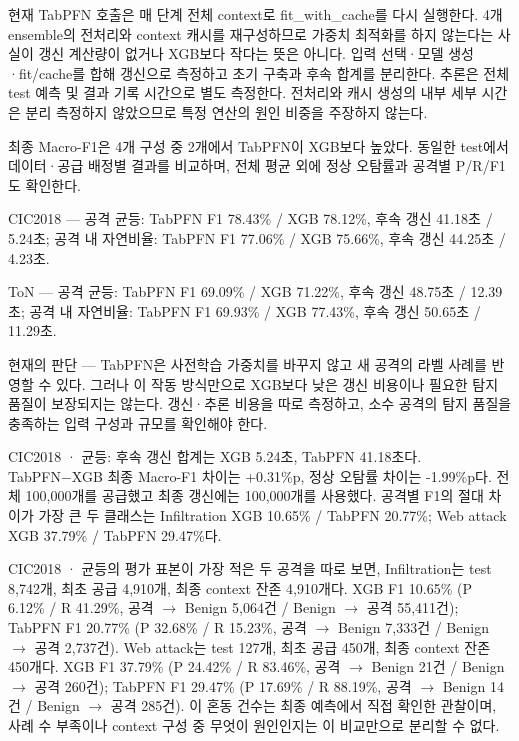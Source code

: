 현재 TabPFN 호출은 매 단계 전체 context로 fit\_\allowbreak{}with\_\allowbreak{}cache를 다시 실행한다. 4개 ensemble의 전처리와 context 캐시를 재구성하므로 가중치 최적화를 하지 않는다는 사실이 갱신 계산량이 없거나 XGB보다 작다는 뜻은 아니다. 입력 선택·모델 생성·fit/\allowbreak{}cache를 합해 갱신으로 측정하고 초기 구축과 후속 합계를 분리한다. 추론은 전체 test 예측 및 결과 기록 시간으로 별도 측정한다. 전처리와 캐시 생성의 내부 세부 시간은 분리 측정하지 않았으므로 특정 연산의 원인 비중을 주장하지 않는다.

최종 Macro-F1은 4개 구성 중 2개에서 TabPFN이 XGB보다 높았다. 동일한 test에서 데이터·공급 배정별 결과를 비교하며, 전체 평균 외에 정상 오탐률과 공격별 P/\allowbreak{}R/\allowbreak{}F1도 확인한다.

CIC2018 — 공격 균등: TabPFN F1 78.43\% /\allowbreak{} XGB 78.12\%, 후속 갱신 41.18초 /\allowbreak{} 5.24초; 공격 내 자연비율: TabPFN F1 77.06\% /\allowbreak{} XGB 75.66\%, 후속 갱신 44.25초 /\allowbreak{} 4.23초.

ToN — 공격 균등: TabPFN F1 69.09\% /\allowbreak{} XGB 71.22\%, 후속 갱신 48.75초 /\allowbreak{} 12.39초; 공격 내 자연비율: TabPFN F1 69.93\% /\allowbreak{} XGB 77.43\%, 후속 갱신 50.65초 /\allowbreak{} 11.29초.

현재의 판단 — TabPFN은 사전학습 가중치를 바꾸지 않고 새 공격의 라벨 사례를 반영할 수 있다. 그러나 이 작동 방식만으로 XGB보다 낮은 갱신 비용이나 필요한 탐지 품질이 보장되지는 않는다. 갱신·추론 비용을 따로 측정하고, 소수 공격의 탐지 품질을 충족하는 입력 구성과 규모를 확인해야 한다.

CIC2018 · 균등: 후속 갱신 합계는 XGB 5.24초, TabPFN 41.18초다. TabPFN−XGB 최종 Macro-F1 차이는 +\allowbreak{}0.31\%p, 정상 오탐률 차이는 -1.99\%p다. 전체 100,000개를 공급했고 최종 갱신에는 100,000개를 사용했다. 공격별 F1의 절대 차이가 가장 큰 두 클래스는 Infiltration XGB 10.65\% /\allowbreak{} TabPFN 20.77\%; Web attack XGB 37.79\% /\allowbreak{} TabPFN 29.47\%다.

CIC2018 · 균등의 평가 표본이 가장 적은 두 공격을 따로 보면, Infiltration는 test 8,742개, 최초 공급 4,910개, 최종 context 잔존 4,910개다. XGB F1 10.65\% (P 6.12\% /\allowbreak{} R 41.29\%, 공격 \ensuremath{\rightarrow} Benign 5,064건 /\allowbreak{} Benign \ensuremath{\rightarrow} 공격 55,411건); TabPFN F1 20.77\% (P 32.68\% /\allowbreak{} R 15.23\%, 공격 \ensuremath{\rightarrow} Benign 7,333건 /\allowbreak{} Benign \ensuremath{\rightarrow} 공격 2,737건). Web attack는 test 127개, 최초 공급 450개, 최종 context 잔존 450개다. XGB F1 37.79\% (P 24.42\% /\allowbreak{} R 83.46\%, 공격 \ensuremath{\rightarrow} Benign 21건 /\allowbreak{} Benign \ensuremath{\rightarrow} 공격 260건); TabPFN F1 29.47\% (P 17.69\% /\allowbreak{} R 88.19\%, 공격 \ensuremath{\rightarrow} Benign 14건 /\allowbreak{} Benign \ensuremath{\rightarrow} 공격 285건). 이 혼동 건수는 최종 예측에서 직접 확인한 관찰이며, 사례 수 부족이나 context 구성 중 무엇이 원인인지는 이 비교만으로 분리할 수 없다.

